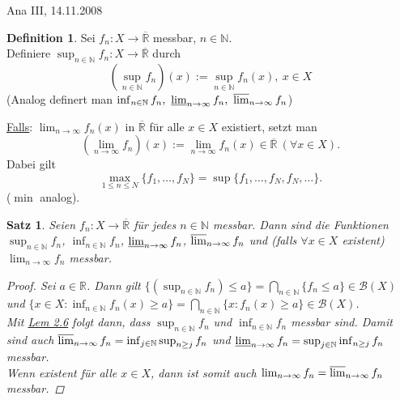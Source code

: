 \documentclass[a4paper]{scrreprt}
\newcommand{\R}{\mathbb{R}}
\newcommand{\Rq}{\overline{\R}}
\newcommand{\N}{\mathbb{N}}
\newcommand{\Borel}{\mathcal{B}}
\newcommand{\toInf}{\rightarrow \infty}
\newcommand{\limToInf}[1]{\lim_{#1 \toInf}}
\newcommand{\jlabel}[1]{\label{j_#1}}
\newcommand{\jhyperref}[2]{\hyperref[j_#1]{#2}}
\newcommand{\jlink}[1]{\jhyperref{#1}{#1}}
\newcommand{\jabb}[3]{ #1: #2 \rightarrow #3 }
\newcommand{\jspacesmall}{\vspace{4pt}}
\newcommand{\jdate}[1]{\jspacesmall\begin{center}\jlabel{#1}\tiny{Ana III, #1}\end{center}}
\theoremstyle{plain}
\newtheorem{satz}[thm]{Satz}
\theoremstyle{definition}
\newtheorem*{defn*}{Definition}
\begin{document}
{{{\jdate{14.11.2008}

\begin{defn*}
    Sei $\jabb{f_n}{X}{\Rq}$ messbar, $n\in\N$.\\
    Definiere $\jabb{\sup_{n\in\N} f_n}{X}{\Rq}$ durch 
    \begin{displaymath}
            \left( \sup_{n\in\N} f_n \right)(x) := \sup_{n\in\N} f_n(x), \ x\in X
    \end{displaymath}
    (Analog definert man $\inf_{n\in\N} f_n, \ \varliminf_{n\rightarrow \infty} f_n, \ \varlimsup_{n\rightarrow \infty} f_n$)
    
    \vspace{12pt}
    
    \uline{Falls}: $\limToInf{n} f_n(x)$ in $\Rq$ für alle $x\in X$ existiert, setzt man
    \begin{displaymath}
        \left (\limToInf{n} f_n \right)(x) := \limToInf{n} f_n(x) \in \Rq \ (\forall x\in X).
    \end{displaymath}
    Dabei gilt
    \begin{displaymath}
        \max_{1\le n\le N}\{f_1,\dots,f_N\} = \sup\{f_1,\dots,f_N, f_N,\dots\}.
    \end{displaymath}
    ($\min$ analog).
\end{defn*}


\begin{satz}
\jlabel{Satz 2.7}
    Seien $\jabb{f_n}{X}{\Rq}$ für jedes $n\in\N$ messbar. Dann sind die Funktionen $\sup_{n\in\N}f_n$, $\inf_{n\in\N} f_n$, $\varliminf_{n\rightarrow \infty} f_n$, $\varlimsup_{n\rightarrow \infty} f_n$ und (falls $\forall x \in X$ existent) $\limToInf{n} f_n$ messbar.
    \begin{proof}
        Sei $a\in \R$. Dann gilt $\{(\sup_{n\in\N} f_n) \le a\} = \bigcap_{n\in\N} \{f_n \le a\} \in \Borel(X)$ und $\{x\in X : \inf_{n\in \N} f_n(x) \ge a\} = \bigcap_{n\in\N} \{x: f_n(x) \ge a\} \in \Borel(X)$.\\
        Mit \jlink{Lem 2.6} folgt dann, dass $\sup_{n\in\N} f_n$ und $\inf_{n\in\N} f_n$ messbar sind. Damit sind auch $\varlimsup_{n\rightarrow \infty} f_n = \inf_{j\in \N} \sup_{n\ge j} f_n$ und $\varliminf_{n\rightarrow \infty} f_n = \sup_{j\in\N}\inf_{n\ge j} f_n$ messbar.\\
        Wenn existent für alle $x\in X$, dann ist somit auch $\limToInf{n} f_n = \varlimsup_{n\rightarrow \infty} f_n$ messbar.
    \end{proof}
\end{satz}

}}}
\end{document}
